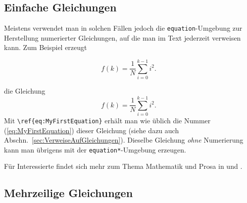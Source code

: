 \subsection{Einfache Gleichungen} 

Meistens verwendet man in solchen Fällen jedoch die \texttt{equation}-Umgebung zur Herstellung numerierter Gleichungen, auf die man im Text jederzeit verweisen kann. Zum Beispiel erzeugt
%
\begin{LaTeXCode}[numbers=none]
\begin{equation}
  f(k) = \frac{1}{N} \sum_{i=0}^{k-1} i^2 . 
  \label{eq:MyFirstEquation}
\end{equation}
\end{LaTeXCode}
%
die Gleichung
%
\begin{equation}
  f(k) = \frac{1}{N} \sum_{i=0}^{k-1} i^2 . 
\label{eq:MyFirstEquation}
\end{equation}
%
Mit \verb!\ref{eq:MyFirstEquation}! erhält man wie üblich die Nummer (\ref{eq:MyFirstEquation}) dieser Gleichung (siehe dazu auch Abschn.\ \ref{sec:VerweiseAufGleichungen}). 
Dieselbe Gleichung \emph{ohne} Numerierung kann man übrigens mit der \texttt{equation*}-Umgebung erzeugen.



\begin{center}
\setlength{\fboxrule}{0.2mm}
\setlength{\fboxsep}{2mm}
\end{center}
%
Für Interessierte findet sich mehr zum Thema Mathematik und Prosa in \cite{Mermin89} und \cite{Higham98}.

\subsection{Mehrzeilige Gleichungen}

